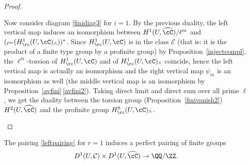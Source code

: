 \begin{proof}
\begin{enumeratea}
Now consider diagram \eqref{finidiag3} for $i=1$. By the previous duality,
the left vertical map induces an isomorphism between
$H^1(U, \widehat \cC)/\ell^m$ and $(_{\ell^m} (H^1_\rc(U,\cC)_{\wedge}))^*$.
Since $H^1_\rc(U,\cC)$ is in the class $\mathcal E$ (that is:
it is the product of a finite type group by a profinite
group) by Proposition~\ref{injectcompl},
the $\ell^m$-torsion of $H^1_\rc(U,\cC)$ and of
$H^1_\rc(U,\cC)_{\wedge}$ coincide, hence the left vertical map is
actually an isomorphism and the right vertical map $\psi_m$ is an
isomorphism as well (the middle vertical map
is an isomorphism by Proposition~\ref{avfini}\,\eqref{avfini2}).
Taking direct limit and direct sum over
all prime $\ell$, we get
the duality between the torsion group (\cf Proposition~\ref{finivanish2})
$H^2(U,\widehat \cC)$ and
the profinite group $H^0_\rc(U,\cC)_{\wedge}$.\qedhere
\end{enumeratea}
\end{proof}

\begin{prop} \label{duald1}
The pairing \eqref{leftpairing} for $r=1$
induces a perfect pairing of finite groups
\begin{equation} \label{d1pairing}
D^1(U, \mathcal C) \times D^1(U,\widehat \cC) \to \QQ/\ZZ.
\end{equation}
\end{prop}

